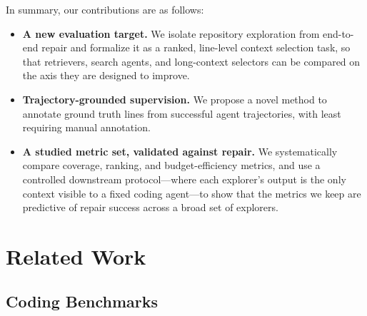 \documentclass{llmxive}
\providecommand{\cmkg}{\ding{51}}
\providecommand{\xmkr}{\ding{55}}
\begin{document}
In summary, our contributions are as follows:


\begin{itemize}[leftmargin=*,itemsep=2pt,topsep=0pt]

\item \textbf{A new evaluation target.} We isolate repository exploration from end-to-end repair and formalize it as a ranked, line-level context selection task, so that retrievers, search agents, and long-context selectors can be compared on the axis they are designed to improve.

\item \textbf{Trajectory-grounded supervision.} We propose a novel method to annotate ground truth lines from successful agent trajectories, with least requiring manual annotation.

\item \textbf{A studied metric set, validated against repair.} We systematically compare coverage, ranking, and budget-efficiency metrics, and use a controlled downstream protocol---where each explorer's output is the only context visible to a fixed coding agent---to show that the metrics we keep are predictive of repair success across a broad set of explorers.

\end{itemize}

\section{Related Work}
\subsection{Coding Benchmarks}

\providecommand{\cmkg}{}
\providecommand{\xmkr}{}
\end{document}
